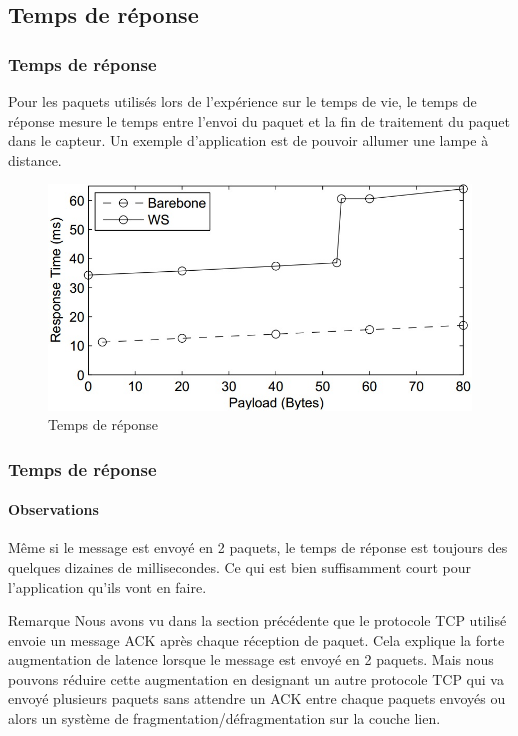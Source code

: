 \subsection{Temps de réponse}
\begin{frame}
 \frametitle{Temps de réponse}
 Pour les paquets utilisés lors de l'expérience sur le temps de vie, le temps de réponse mesure le temps entre l'envoi du paquet et la fin de traitement du paquet dans le capteur.
 Un exemple d'application est de pouvoir allumer une lampe à distance.
 \begin{figure}
  \centering
  \includegraphics[scale=0.35]{figures/treponse.jpg}
  \caption{Temps de réponse}
 \end{figure} 
\end{frame}
 
\begin{frame}
 \frametitle{Temps de réponse}
 \framesubtitle{Observations}
 Même si le message est envoyé en 2 paquets, le temps de réponse est toujours des quelques dizaines de millisecondes.
 Ce qui est bien suffisamment court pour l'application qu'ils vont en faire.\\
 \begin{block}{Remarque}
 Nous avons vu dans la section précédente que le protocole TCP utilisé envoie un message ACK après chaque réception de paquet.
 Cela explique la forte augmentation de latence lorsque le message est envoyé en 2 paquets.
 Mais nous pouvons réduire cette augmentation en designant un autre protocole TCP qui va envoyé plusieurs paquets sans attendre un ACK entre chaque paquets envoyés ou alors un système de fragmentation/défragmentation sur la couche lien.
 \end{block}
\end{frame}